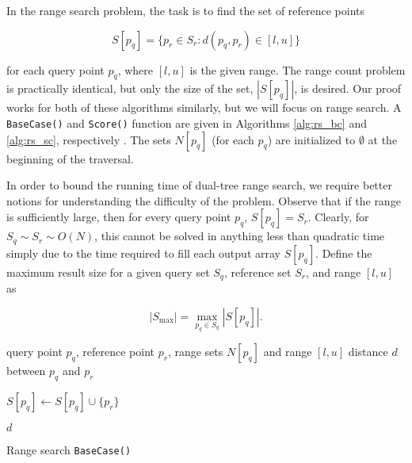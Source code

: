In the range search problem, the task is to find the set of reference points

\begin{equation}
S[p_q] = \{ p_r \in S_r : d(p_q, p_r) \in [l, u] \}
\end{equation}

\noindent for each query point $p_q$, where $[l, u]$ is the given
range.  The range count problem is practically identical, but only the size of
the set, $|S[p_q]|$, is desired.
Our proof works for both of these algorithms
similarly, but we will focus on range search.  A \texttt{BaseCase()} and
\texttt{Score()} function are given in Algorithms \ref{alg:rs_bc} and
\ref{alg:rs_sc}, respectively \citep[a correctness proof can be found
in][]{curtin2013tree}.  The sets $N[p_q]$ (for each $p_q$) are
initialized to $\emptyset$ at the beginning of the traversal.

In order to bound the running time of dual-tree range search, we require better
notions for understanding the difficulty of the problem.  Observe that if the
range is sufficiently large, then for every query point $p_q$, $S[p_q] = S_r$.
Clearly, for $S_q \sim S_r \sim O(N)$, this cannot be solved in anything less
than quadratic time simply due to the time required to fill each output array
$S[p_q]$.  Define the maximum result size for a given query set $S_q$, reference
set $S_r$, and range $[l, u]$ as

\begin{equation}
| S_{\max} | = \max_{p_q \in S_q} | S[p_q] |.
\label{eqn:smax}
\end{equation}

\begin{algorithm}[tb]
\begin{algorithmic}[1]
     query point $p_q$, reference point $p_r$, range
sets $N[p_q]$ and range $[l, u]$
     distance $d$ between $p_q$ and $p_r$


    \STATE  $S[p_q] \gets S[p_q] \cup \{ p_r \}$
    \ENDIF

    \RETURN $d$
  \end{algorithmic}
  \caption{Range search \texttt{BaseCase()}}
  \label{alg:rs_bc}
\end{algorithm}

